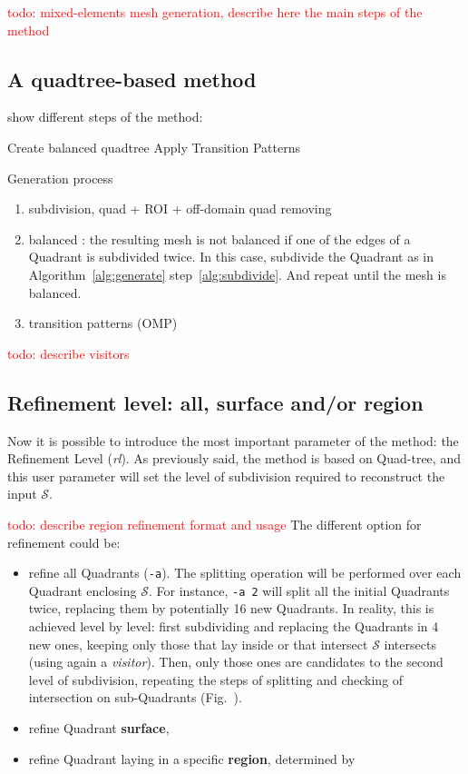 \documentclass[10pt]{article}
\begin{document}
\textcolor{red}{todo: mixed-elements mesh generation, describe here the main steps of the method}

\subsection{A quadtree-based method}
show different steps of the method: 

\begin{algorithm}[H]
\SetAlgoLined
{}
 \nl {}
 \nl Create balanced quadtree\; \label{alg:goto}
 \nl Apply Transition Patterns\;
 \caption{Generation process}
 \label{alg:generate}
\end{algorithm}


\begin{enumerate}
\item subdivision, quad + ROI + off-domain quad removing
\item balanced : the resulting mesh is not balanced if one of the edges of a Quadrant is subdivided twice. In this case, subdivide the Quadrant as in Algorithm~\ref{alg:generate} step~\ref{alg:subdivide}. And repeat until the mesh is balanced.
\item transition patterns (OMP)
\end{enumerate}

\textcolor{red}{todo: describe visitors}


\subsection{Refinement level: all, surface and/or region}
\label{s:refinement}
Now it is possible to introduce the most important parameter of the method: the Refinement Level (\textit{rl}).
As previously said, the method is based on Quad-tree, and this user parameter will set the level of subdivision required to reconstruct the input $\mathcal{S}$.

\textcolor{red}{todo: describe region refinement format and usage}
The different option for refinement could be:
\begin{itemize}
\item refine all Quadrants (\texttt{-a}). The splitting operation will be performed over each Quadrant enclosing $\mathcal{S}$. For instance, \texttt{-a 2} will split all the initial Quadrants twice, replacing them by potentially 16 new Quadrants. In reality, this is achieved level by level: first subdividing and replacing the Quadrants in 4 new ones, keeping only those that lay inside or that intersect $\mathcal{S}$ intersects (using again a \textit{visitor}). Then, only those ones are candidates to the second level of subdivision, repeating the steps of splitting and checking of intersection on sub-Quadrants (Fig.~). 
\item refine Quadrant \textbf{surface},
\item refine Quadrant laying in a specific \textbf{region}, determined by 
\end{itemize}
\end{document}
